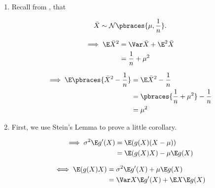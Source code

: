 \begin{solution}

\phantom{}

\begin{enumerate}[label = (\alph*)]

    \item Recall from \cite[lecture 4, slide 27]{EStat}, that

    \begin{align*}
        \bar X
        \sim
        \mathcal N \pbraces{\mu, \frac{1}{n}}.
    \end{align*}
    
    
    \begin{align*}
        \implies
        \E \bar X^2
        & =
        \Var \bar X + \E^2 \bar X \\
        & =
        \frac{1}{n} + \mu^2
    \end{align*}
    
    \begin{align*}
        \implies
        \E \pbraces{\bar X^2 - \frac{1}{n}}
        & =
        \E \bar X^2 - \frac{1}{n} \\
        & =
        \pbraces{\frac{1}{n} + \mu^2} - \frac{1}{n} \\
        & =
        \mu^2
    \end{align*}

    \item First, we use Stein's Lemma to prove a little corollary.
    
    \begin{align*}
        \implies
        \sigma^2 \E g^\prime(X)
        & =
        \E (g(X) (X - \mu)) \\
        & =
        \E (g(X) X) - \mu \E g(X)
    \end{align*}

    \begin{align*}
        \iff
        \E(g(X) X)
        & =
        \sigma^2 \E g^\prime(X) + \mu \E g(X) \\
        & =
        \Var X \E g^\prime(X) + \E X \E g(X)
    \end{align*}


\end{enumerate}
\end{solution}
